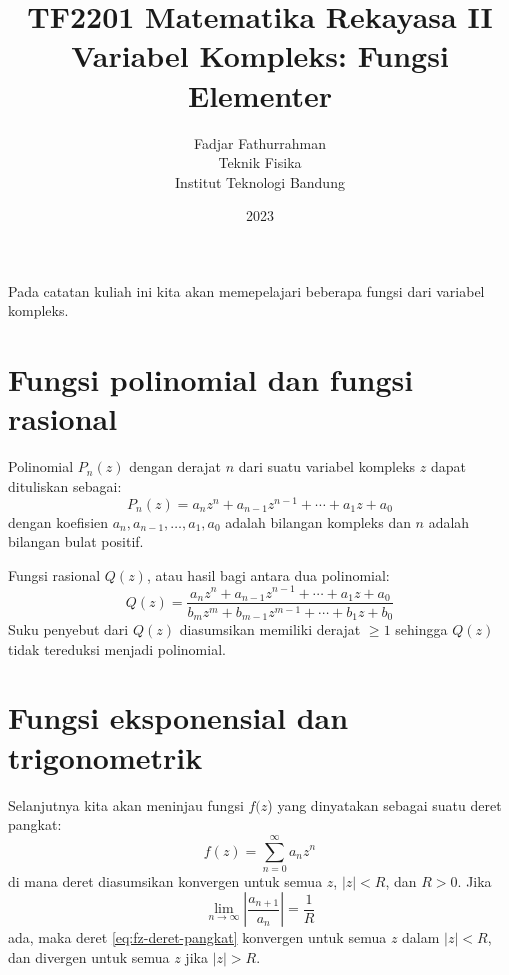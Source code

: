 



\title{%
{\small TF2201 Matematika Rekayasa II}\\
Variabel Kompleks: Fungsi Elementer
}
\author{Fadjar Fathurrahman\\
Teknik Fisika\\
Institut Teknologi Bandung}
\date{2023}
\maketitle

Pada catatan kuliah ini kita akan memepelajari beberapa fungsi dari
variabel kompleks.


\section{Fungsi polinomial dan fungsi rasional}
Polinomial $P_n(z)$ dengan derajat $n$ dari suatu variabel kompleks $z$ dapat
dituliskan sebagai:
\begin{equation}
P_{n}(z) = a_{n}z^{n} + a_{n-1}z^{n-1} + \cdots + a_{1}z + a_{0}
\end{equation}
dengan koefisien $a_{n},a_{n-1},\ldots,a_{1},a_{0}$ adalah bilangan
kompleks dan $n$ adalah bilangan bulat positif.

Fungsi rasional $Q(z)$, atau hasil bagi antara dua polinomial:
\begin{equation}
Q(z) = \frac{a_{n}z^{n} + a_{n-1}z^{n-1} + \cdots + a_{1}z + a_{0}}%
{b_{m}z^{m}+b_{m-1}z^{m-1}+\cdots+b_{1}z+b_{0}}
\end{equation}
Suku penyebut dari $Q(z)$ diasumsikan memiliki derajat $\geq 1$ sehingga
$Q(z)$ tidak tereduksi menjadi polinomial.


\section{Fungsi eksponensial dan trigonometrik}

Selanjutnya kita akan meninjau fungsi $f(z$) yang dinyatakan
sebagai suatu deret pangkat:
\begin{equation}
f(z) = \sum_{n=0}^{\infty} a_{n} z^{n}
\label{eq:fz-deret-pangkat}
\end{equation}
di mana deret diasumsikan konvergen untuk semua $z$, $|z|<R$, dan
$R>0$. Jika
\begin{equation*}
\lim_{n\rightarrow\infty}\left|\frac{a_{n+1}}{a_{n}}\right|=\frac{1}{R}
\end{equation*}
ada, maka deret \ref{eq:fz-deret-pangkat}
konvergen untuk semua $z$ dalam $|z| < R$, dan divergen untuk semua $z$
jika $|z| > R$.

